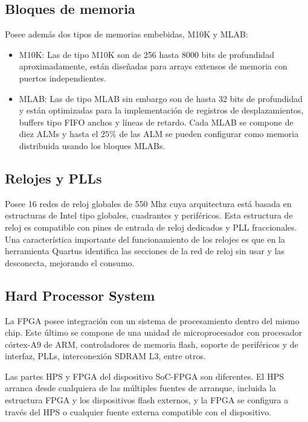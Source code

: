 \subsection{Bloques de memoria}

Posee además dos tipos de memorias embebidas, M10K y MLAB:

\begin{itemize}
\item
M10K: Las de tipo M10K son de 256 hasta 8000 bits de profundidad aproximadamente, están diseñadas para arrays extensos de memoria con puertos independientes.
\item
MLAB: Las de tipo MLAB sin embargo son de hasta 32 bits de profundidad y están optimizadas para la implementación de registros de desplazamientos, buffers tipo FIFO anchos y líneas de retardo. Cada MLAB se compone de diez ALMs y hasta el $25\%$ de las ALM se pueden configurar como memoria distribuida usando los bloques MLABs.
\end{itemize}

\subsection{Relojes y PLLs}
Posee 16 redes de reloj globales de 550 Mhz cuya arquitectura está basada en estructuras de Intel tipo globales, cuadrantes y periféricos. Esta estructura de reloj es compatible con pines de entrada de reloj dedicados y PLL fraccionales. Una característica importante del funcionamiento de los relojes es que en la herramienta Quartus identifica las secciones de la red de reloj sin usar y las desconecta, mejorando el consumo.


\subsection{Hard Processor System}
La FPGA posee integración con un sistema de procesamiento dentro del mismo chip. Este último se compone de una unidad de microprocesador con procesador córtex-A9 de ARM, controladores de memoria flash, soporte de periféricos y de interfaz, PLLs, interconexión SDRAM L3, entre otros.

Las partes HPS y FPGA del dispositivo SoC-FPGA son diferentes. El HPS arranca desde cualquiera de las múltiples fuentes de arranque, incluida la estructura FPGA y los dispositivos flash externos, y la FPGA se configura a través del HPS o cualquier fuente externa compatible con el dispositivo.






